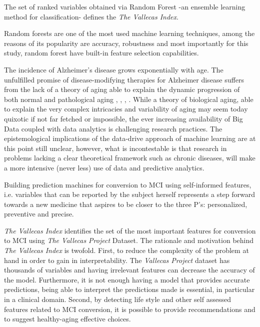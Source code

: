 \documentclass[preprint,12pt]{elsarticle}
\begin{document}
The set of ranked variables obtained via Random Forest -an ensemble learning method for classification- defines the \emph{The Vallecas Index}. 

Random forests are one of the most used machine learning techniques, among the reasons of its popularity are accuracy, robustness and most importantly for this study, random forest have built-in feature selection capabilities. 


The incidence of Alzheimer’s disease grows exponentially with age. 
The unfulfilled promise of disease-modifying therapies for Alzheimer disease suffers from the lack of a theory of aging able to explain the dynamic progression of both normal and pathological aging \cite{cerella1985information}, \cite{mangel2001complex}, \cite{sleimen2014aging}, \cite{cohen2016complex}.
While a theory of biological aging, able to explain the very complex intricacies and variability of aging may seem today quixotic if not far fetched or impossible, the ever increasing availability of Big Data coupled with data analytics is challenging research practices. The epistemological implications of the data-drive approach of machine learning are at this point still unclear, however, what is incontestable is that research in problems lacking a clear theoretical framework such as chronic diseases, will make a more intensive (never less) use of data and predictive analytics.

Building prediction machines for conversion to MCI using self-informed features, i.e. variables that can be reported by the subject herself represents a step forward towards a new medicine that aspires to be closer to the three P's: personalized, preventive and precise. 


\emph{The Vallecas Index} identifies the set of the most important features for conversion to MCI using \emph{The Vallecas Project} Dataset. 
The rationale and motivation behind \emph{The Vallecas Index} is twofold. First, to reduce the complexity of the problem at hand in order to gain in interpretability. The \emph{Vallecas Project} dataset has thousands of variables and having irrelevant features can decrease the accuracy of the model. Furthermore, it is not enough having a model that provides accurate predictions, being able to interpret the predictions made is essential, in particular in a clinical domain.
Second, by detecting life style and other self assessed features related to MCI conversion, it is possible to provide recommendations and to suggest healthy-aging effective choices.
\end{document}
